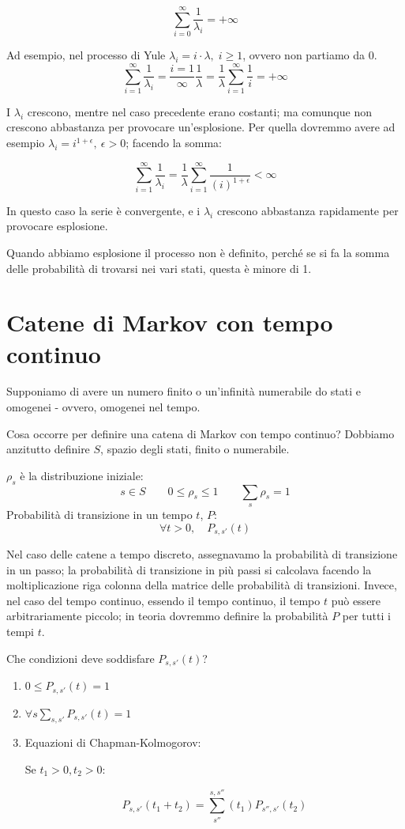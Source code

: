 \documentclass[a4paper,12pt]{book}
\begin{document}
$$ \sum_{i=0}^{\infty} \frac{1}{\lambda_i} = +\infty $$

Ad esempio, nel processo di Yule $\lambda_i = i\cdot \lambda, \; i \ge 1$, ovvero non partiamo da 0. 
$$ \sum_{i=1}^\infty \frac{1}{\lambda_i} = \frac{i=1}{\infty} \frac{1}{\lambda} = \frac{1}{\lambda} \sum_{i=1}^\infty \frac{1}{i} = +\infty$$

I $\lambda_i$ crescono, mentre nel caso precedente erano costanti; ma comunque non crescono  abbastanza per provocare un'esplosione. Per quella dovremmo avere ad esempio $\lambda_i = i^{1+  \epsilon}, \ \epsilon > 0$; facendo la somma:

$$ \sum_{i=1}^{\infty} \frac{1}{\lambda_i} = \frac{1}{\lambda} \sum_{i=1}^{\infty} \frac{1}{(i)^{1+\epsilon}}  < \infty$$

In questo caso la serie è convergente, e i $ \lambda_i $ crescono abbastanza rapidamente per provocare esplosione. 

Quando abbiamo esplosione il processo non è definito, perché se si fa la somma delle probabilità di trovarsi nei vari stati, questa è minore di 1. 
 
\chapter{Catene di Markov con tempo continuo} 
Supponiamo di avere un numero finito o un'infinità numerabile do stati e omogenei - ovvero, omogenei nel tempo. 

Cosa occorre per definire una catena di Markov con tempo continuo? Dobbiamo anzitutto definire $ S $, spazio degli stati, finito o numerabile.

$\rho_s$ è la distribuzione iniziale:
$$ s \in S \qquad 0 \le \rho_s \le 1 \qquad \sum_{s} \rho_s = 1 $$
Probabilità di transizione in un tempo $ t $, $ P $:
$$ \forall t > 0,\quad P_{s,s'}(t)  $$

Nel caso delle catene a tempo discreto, assegnavamo la probabilità di transizione in un passo; la probabilità di transizione in più passi si calcolava facendo la moltiplicazione riga colonna della matrice delle probabilità di transizioni. Invece, nel caso del tempo continuo, essendo il tempo continuo, il tempo $ t $ può essere arbitrariamente piccolo; in teoria dovremmo definire la probabilità $ P $ per tutti i tempi $ t $. 

Che condizioni deve soddisfare $ P_{s,s'}(t) $?

\begin{enumerate}
	\item $ 0 \le P_{s,s'}(t) = 1 $
	\item $ \forall s \sum_{s,s'} P_{s,s'}(t) = 1 $
	\item Equazioni di Chapman-Kolmogorov:
	
	Se $ t_1 > 0, t_2 > 0 $:
	
	$$ P_{s,s'}(t_1 + t_2) = \sum_{s''}^{s,s''} (t_1) P_{s'',s'}(t_2) $$
\end{enumerate}
\end{document}
